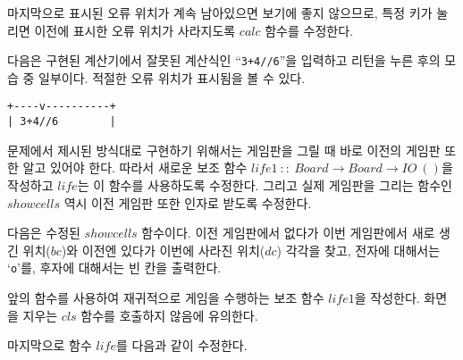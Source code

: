 마지막으로 표시된 오류 위치가 계속 남아있으면 보기에 좋지 않으므로, 특정 키가
눌리면 이전에 표시한 오류 위치가 사라지도록 $calc$ 함수를 수정한다.


다음은 구현된 계산기에서 잘못된 계산식인 ``\texttt{3+4//6}''을 입력하고 리턴을
누른 후의 모습 중 일부이다. 적절한 오류 위치가 표시됨을 볼 수 있다.

\begin{lstlisting}
+----v----------+
| 3+4//6        |
\end{lstlisting}


문제에서 제시된 방식대로 구현하기 위해서는 게임판을 그릴 때 바로 이전의
게임판 또한 알고 있어야 한다. 따라서 새로운 보조 함수 $life1~::~Board
\rightarrow Board \rightarrow IO~()$을 작성하고 $life$는 이 함수를 사용하도록
수정한다. 그리고 실제 게임판을 그리는 함수인 $showcells$ 역시 이전 게임판 또한
인자로 받도록 수정한다.

다음은 수정된 $showcells$ 함수이다. 이전 게임판에서 없다가 이번 게임판에서
새로 생긴 위치($bc$)와 이전엔 있다가 이번에 사라진 위치($dc$) 각각을 찾고,
전자에 대해서는 `\texttt{o}'를, 후자에 대해서는 빈 칸을 출력한다.


앞의 함수를 사용하여 재귀적으로 게임을 수행하는 보조 함수 $life1$을
작성한다. 화면을 지우는 $cls$ 함수를 호출하지 않음에 유의한다.


마지막으로 함수 $life$를 다음과 같이 수정한다.






